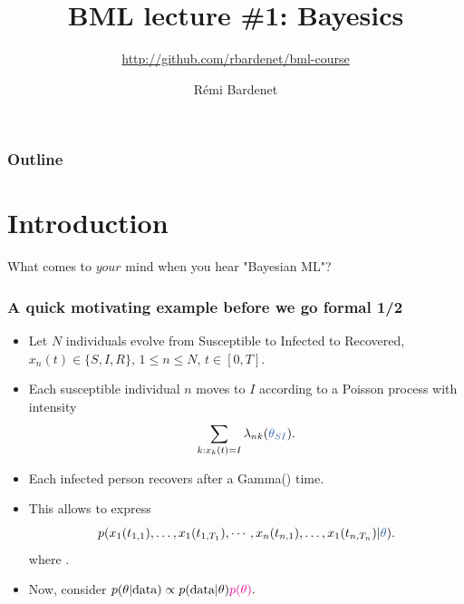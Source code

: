 \documentclass[10pt]{beamer}
\title[Bayesian ML: Bayesics]{BML lecture \#1: Bayesics}
\subtitle{\url{http://github.com/rbardenet/bml-course}}
\author[Rémi Bardenet (CNRS \& Univ. Lille)] %
{Rémi Bardenet}
\institute[] %
{
  CNRS \& CRIStAL, Univ. Lille, France\\
\vspace{1cm}
\texttt{[image: /Users/rbardenet/Work/Tex/PosterImages/logoCNRS.pdf]}
\qquad \texttt{[image: /Users/rbardenet/Work/Tex/PosterImages/cristalLogo.pdf]}
}
\date{}
\begin{document}
\begin{frame}
\maketitle
\end{frame}

\begin{frame}
\frametitle{Outline}
\tableofcontents
\end{frame}

\section{Introduction}

\begin{frame}{What comes to $your$ mind when you hear "Bayesian ML"?}

\end{frame}

\begin{frame}
  \frametitle{A quick motivating example before we go formal 1/2}
  \begin{itemize}
    \vfill\item Let $N$ individuals evolve from Susceptible to Infected to Recovered, $x_n(t) \in\{S,I,R\}$, $1\leq n\leq N$, $t\in[0,T]$.
    \vfill\item Each susceptible individual $n$ moves to $I$ according to a Poisson process with intensity
    $$\sum_{k:x_k(t)=I} \lambda_{nk}(\unn{\theta_{SI}}).$$
    \vfill\item Each infected person recovers after a Gamma() time.
    \vfill\item This allows to express
    $$
    p(x_1(t_{1,1}), \dots, x_1(t_{1,T_1}), \cdots, x_n(t_{n,1}), \dots, x_1(t_{n,T_n})\vert \unn{\theta}).
    $$
    where .
    \vfill\item Now, consider $p(\theta\vert \text{data}) \propto p(\text{data}\vert \theta) \textcolor{magenta}{p(\theta)}.$
  \end{itemize}
\end{frame}
\end{document}
